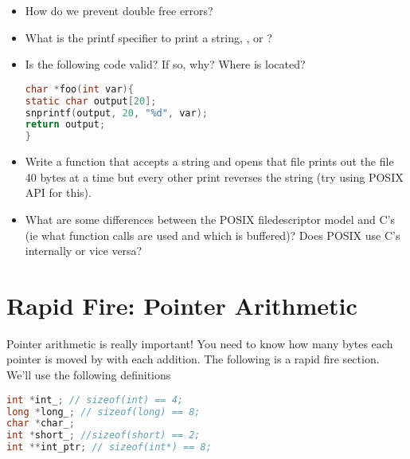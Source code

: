 \begin{itemize}
	      \begin{itemize}
		      \tightlist
		      \item
		      \item
		      \item
		      \item
		      \item
	      \end{itemize}
	\item
	      How do we prevent double free errors?
	\item
	      What is the printf specifier to print a string, , or
	      ?
	\item
	      Is the following code valid? If so, why? Where is 
	      located?

	      \begin{lstlisting}[language=C]
char *foo(int var){
static char output[20];
snprintf(output, 20, "%d", var);
return output;
}
\end{lstlisting}
	\item
	      Write a function that accepts a string and opens that file prints out the file 40 bytes at a time but every other print reverses the string (try using POSIX API for this).
	\item
	      What are some differences between the POSIX filedescriptor model and C's  (ie what function calls are used and which is buffered)? Does POSIX use C's  internally or vice versa?
\end{itemize}

\section{Rapid Fire: Pointer Arithmetic}

Pointer arithmetic is really important! You need to know how many bytes each pointer is moved by with each addition. The following is a rapid fire section. We'll use the following definitions

\begin{lstlisting}[language=C]
int *int_; // sizeof(int) == 4;
long *long_; // sizeof(long) == 8;
char *char_;
int *short_; //sizeof(short) == 2;
int **int_ptr; // sizeof(int*) == 8;
\end{lstlisting}

